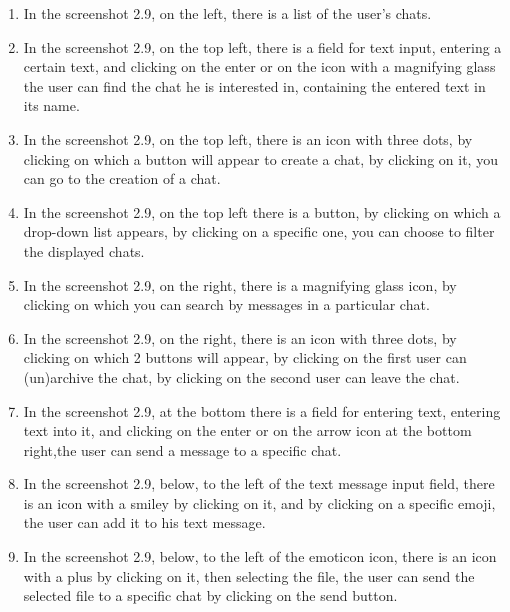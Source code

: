 \begin{enumerate}
    \item In the screenshot 2.9, on the left, there is a list of the user's chats.
    \item In the screenshot 2.9, on the top left, there is a field for text input, entering a certain text,
    and clicking on the enter or on the icon with a magnifying glass the user can find the chat he is interested in,
    containing the entered text in its name.
    \item In the screenshot 2.9, on the top left, there is an icon with three dots, by clicking on which a button will appear to create a chat,
    by clicking on it, you can go to the creation of a chat.
    \item In the screenshot 2.9, on the top left there is a button, by clicking on which a drop-down list appears,
    by clicking on a specific one, you can choose to filter the displayed chats.
    \item In the screenshot 2.9, on the right, there is a magnifying glass icon, by clicking on which you can search by messages in a particular chat.
    \item In the screenshot 2.9, on the right, there is an icon with three dots, by clicking on which 2 buttons will appear,
    by clicking on the first user can (un)archive the chat, by clicking on the second user can leave the chat.
    \item In the screenshot 2.9, at the bottom there is a field for entering text, entering text into it,
    and clicking on the enter or on the arrow icon at the bottom right,the user can send a message to a specific chat.
    \item In the screenshot 2.9, below, to the left of the text message input field, there is an icon with a smiley by clicking on it,
    and by clicking on a specific emoji, the user can add it to his text message.
    \item In the screenshot 2.9, below, to the left of the emoticon icon, there is an icon with a plus by clicking on it, then selecting the file,
    the user can send the selected file to a specific chat by clicking on the send button.
\end{enumerate}

